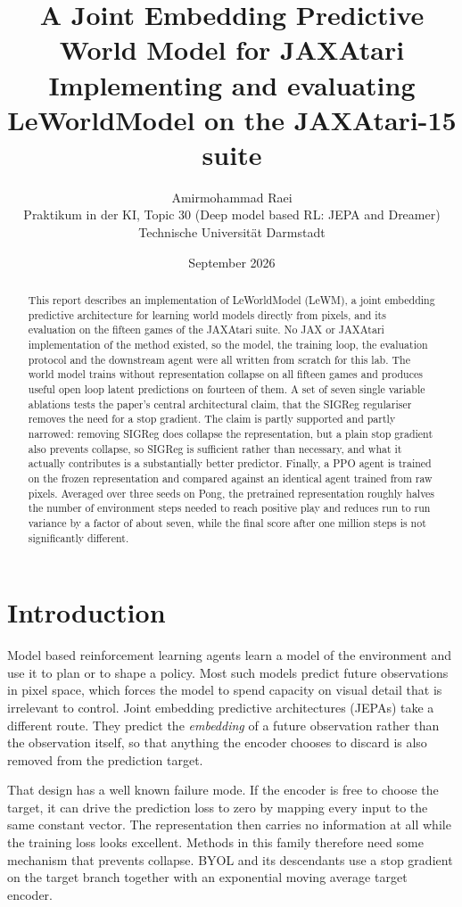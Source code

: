 \documentclass[11pt,a4paper]{article}
\title{A Joint Embedding Predictive World Model for JAXAtari\\
\large Implementing and evaluating LeWorldModel on the JAXAtari-15 suite}
\author{Amirmohammad Raei\\
Praktikum in der KI, Topic 30 (Deep model based RL: JEPA and Dreamer)\\
Technische Universit\"at Darmstadt}
\date{September 2026}
\begin{document}
\maketitle

\begin{abstract}
This report describes an implementation of LeWorldModel (LeWM), a joint embedding
predictive architecture for learning world models directly from pixels, and its
evaluation on the fifteen games of the JAXAtari suite. No JAX or JAXAtari
implementation of the method existed, so the model, the training loop, the
evaluation protocol and the downstream agent were all written from scratch for
this lab. The world model trains without representation collapse on all fifteen
games and produces useful open loop latent predictions on fourteen of them. A set
of seven single variable ablations tests the paper's central architectural claim,
that the SIGReg regulariser removes the need for a stop gradient. The claim is
partly supported and partly narrowed: removing SIGReg does collapse the
representation, but a plain stop gradient also prevents collapse, so SIGReg is
sufficient rather than necessary, and what it actually contributes is a
substantially better predictor. Finally, a PPO agent is trained on the frozen
representation and compared against an identical agent trained from raw pixels.
Averaged over three seeds on Pong, the pretrained representation roughly halves
the number of environment steps needed to reach positive play and reduces run to
run variance by a factor of about seven, while the final score after one million
steps is not significantly different.
\end{abstract}

\section{Introduction}

Model based reinforcement learning agents learn a model of the environment and use
it to plan or to shape a policy. Most such models predict future observations in
pixel space, which forces the model to spend capacity on visual detail that is
irrelevant to control. Joint embedding predictive architectures (JEPAs) take a
different route. They predict the \emph{embedding} of a future observation rather
than the observation itself, so that anything the encoder chooses to discard is
also removed from the prediction target.

That design has a well known failure mode. If the encoder is free to choose the
target, it can drive the prediction loss to zero by mapping every input to the
same constant vector. The representation then carries no information at all while
the training loss looks excellent. Methods in this family therefore need some
mechanism that prevents collapse. BYOL and its descendants use a stop gradient on
the target branch together with an exponential moving average target encoder.
\end{document}
